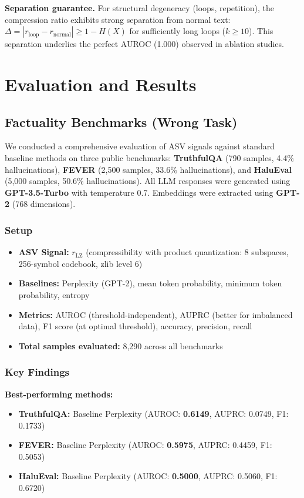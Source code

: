 \documentclass[11pt]{article}
\begin{document}
\textbf{Separation guarantee.} For structural degeneracy (loops, repetition), the compression ratio exhibits strong separation from normal text: $\Delta = |r_{\text{loop}} - r_{\text{normal}}| \ge 1 - H(X)$ for sufficiently long loops ($k \ge 10$). This separation underlies the perfect AUROC (1.000) observed in ablation studies.

\section{Evaluation and Results}
\label{sec:evaluation}

\subsection{Factuality Benchmarks (Wrong Task)}
\label{sec:eval-factuality}

We conducted a comprehensive evaluation of ASV signals against standard baseline methods on three public benchmarks: \textbf{TruthfulQA} (790 samples, 4.4\% hallucinations), \textbf{FEVER} (2,500 samples, 33.6\% hallucinations), and \textbf{HaluEval} (5,000 samples, 50.6\% hallucinations). All LLM responses were generated using \textbf{GPT-3.5-Turbo} with temperature 0.7. Embeddings were extracted using \textbf{GPT-2} (768 dimensions).

\subsubsection{Setup}
\begin{itemize}
\item \textbf{ASV Signal:} $r_{\text{LZ}}$ (compressibility with product quantization: 8 subspaces, 256-symbol codebook, zlib level 6)
\item \textbf{Baselines:} Perplexity (GPT-2), mean token probability, minimum token probability, entropy
\item \textbf{Metrics:} AUROC (threshold-independent), AUPRC (better for imbalanced data), F1 score (at optimal threshold), accuracy, precision, recall
\item \textbf{Total samples evaluated:} 8,290 across all benchmarks
\end{itemize}

\subsubsection{Key Findings}

\textbf{Best-performing methods:}
\begin{itemize}
\item \textbf{TruthfulQA:} Baseline Perplexity (AUROC: \textbf{0.6149}, AUPRC: 0.0749, F1: 0.1733)
\item \textbf{FEVER:} Baseline Perplexity (AUROC: \textbf{0.5975}, AUPRC: 0.4459, F1: 0.5053)
\item \textbf{HaluEval:} Baseline Perplexity (AUROC: \textbf{0.5000}, AUPRC: 0.5060, F1: 0.6720)
\end{itemize}
\end{document}
